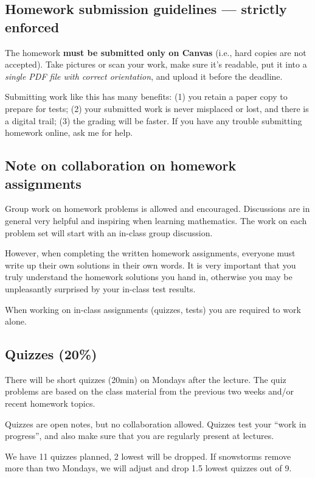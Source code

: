 \documentclass[oneside,11pt]{amsart}
\begin{document}
\subsection*{Homework submission guidelines --- strictly enforced}
The homework \textbf{must be submitted only on Canvas} (i.e., hard copies are not accepted).
Take pictures or scan your work,
make sure it's readable,
put it into a \emph{single PDF file with correct orientation},
and upload it before the deadline.

Submitting work like this has many benefits:
(1) you retain a paper copy to
prepare for tests;
(2) your submitted work is never misplaced or lost, and there is a digital trail;
(3) the grading will be faster.
If you have any trouble submitting homework online, ask me for help.

\subsection*{Note on collaboration on homework assignments}
\label{collaboration}

Group work on homework problems is allowed and encouraged.
Discussions are in general very
helpful and inspiring when learning mathematics.
The work on each problem set will start with an in-class group discussion.

However, when completing the written homework assignments, everyone must write up their own
solutions in their own words.
It is very important that you truly understand the homework solutions you hand
in, otherwise you may be unpleasantly surprised by your in-class test results.

When working on in-class assignments (quizzes, tests)
you are required to work alone.

\subsection{Quizzes (20\%)}

There will be short quizzes (20min) on Mondays after the lecture.
The quiz problems are based on the class material from the previous two weeks
and/or recent homework topics.

Quizzes are open notes, but no collaboration allowed.
Quizzes test your ``work in progress'', and also make sure that you are regularly present at lectures.

We have 11 quizzes planned, 2 lowest will be dropped. If snowstorms remove more than two Mondays, 
we will adjust and drop 1.5 lowest quizzes out of 9.
\end{document}
